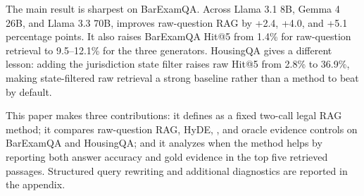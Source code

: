 The main result is sharpest on BarExamQA. Across Llama 3.1 8B, Gemma 4 26B,
and Llama 3.3 70B, \hyre{} improves raw-question RAG by +2.4, +4.0, and +5.1
percentage points. It also raises BarExamQA Hit@5 from 1.4\% for raw-question
retrieval to 9.5--12.1\% for the three \hyre{} generators. HousingQA gives a
different lesson: adding the jurisdiction state filter raises raw Hit@5 from
2.8\% to 36.9\%, making state-filtered raw retrieval a strong baseline rather
than a method to beat by default.

This paper makes three contributions: it defines \hyre{} as a fixed two-call
legal RAG method; it compares raw-question RAG, HyDE, \hyre{}, and oracle
evidence controls on BarExamQA and HousingQA; and it analyzes when the method
helps by reporting both answer accuracy and gold evidence in the top five
retrieved passages. Structured query rewriting and additional diagnostics are
reported in the appendix.
